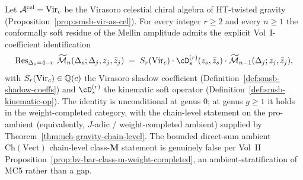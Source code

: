 \begin{theorem}
\label{thm:mellin-shadow-correspondence-explicit}
\ClaimStatusProvedHere
{}
Let $\mathcal A^{\mathrm{cel}} = \mathrm{Vir}_c$ be the Virasoro celestial chiral
algebra of HT-twisted gravity
(Proposition~\ref{prop:smsb-vir-as-cel}). For every integer $r \geq 2$
and every $n \geq 1$ the conformally soft residue of the Mellin
amplitude admits the explicit Vol~I-coefficient identification
\begin{equation}
\label{eq:smsb-bridge-identity}
 \Res_{\Delta_s = 4 - r}\,
 \Mel\cM_n(\Delta_s; \Delta_j, z_j, \bar z_j)
 \;=\;
 S_r(\Vir_c)\cdot
 \cD_s^{(r)}(z_s, \bar z_s)\cdot
 \Mel\cM_{n-1}(\Delta_j; z_j, \bar z_j),
\end{equation}
with $S_r(\mathrm{Vir}_c) \in \mathbb Q(c)$ the Virasoro shadow coefficient
(Definition~\ref{def:smsb-shadow-coeffs}) and $\cD_s^{(r)}$ the
kinematic soft operator (Definition~\ref{def:smsb-kinematic-op}). The
identity is unconditional at genus $0$; at genus $g \geq 1$ it holds in
the weight-completed category, with the chain-level statement on the
pro-ambient (equivalently, $J$-adic / weight-completed ambient)
supplied by Theorem~\ref{thm:uch-gravity-chain-level}. The bounded
direct-sum ambient $\mathrm{Ch}(\mathrm{Vect})$ chain-level
class-$\mathbf M$ statement is genuinely false per Vol~II
Proposition~\ref{prop:bv-bar-class-m-weight-completed}, an
ambient-stratification of MC5 rather than a gap.
\end{theorem}

